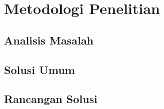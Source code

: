 \chapter{Metodologi Penelitian}

\section{Analisis Masalah}
\blindtext

\section{Solusi Umum}
\blindtext

\section{Rancangan Solusi}
\blindtext